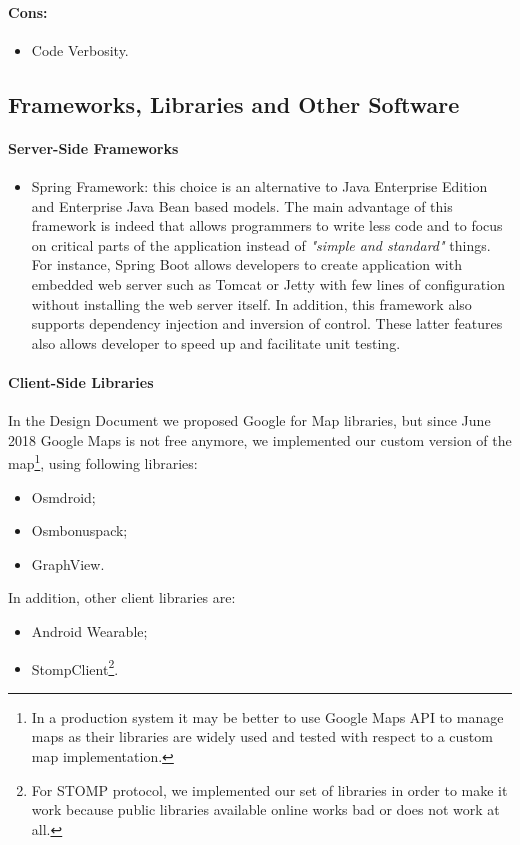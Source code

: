 \documentclass[a4paper]{article}
\begin{document}
\paragraph{Cons:}
\begin{itemize}
    \item Code Verbosity.
\end{itemize}

\subsection{Frameworks, Libraries and Other Software}

\paragraph{Server-Side Frameworks}
\begin{itemize}
    \item Spring Framework: this choice is an alternative to Java Enterprise Edition and Enterprise Java Bean based models. The main advantage of this framework is indeed that allows programmers to write less code and to focus on critical parts of the application instead of \textit{"simple and standard"} things. For instance, Spring Boot allows developers to create application with embedded web server such as Tomcat or Jetty with few lines of configuration without installing the web server itself. In addition, this framework also supports dependency injection and inversion of control. These latter features also allows developer to speed up and facilitate unit testing.
\end{itemize}

\newpage
\paragraph{Client-Side Libraries}
In the Design Document we proposed Google for Map libraries, but since June 2018 Google Maps is not free anymore, we implemented our custom version  of the map\footnote{In a production system it may be better to use Google Maps API to manage maps as their libraries are widely used and tested with respect to a custom map implementation.}, using following libraries:
\begin{itemize}
    \item Osmdroid;
    \item Osmbonuspack;
    \item GraphView.
\end{itemize}
In addition, other client libraries are:
\begin{itemize}    
    \item Android Wearable;
    \item StompClient\footnote{For STOMP protocol, we implemented our set of libraries in order to make it work because public libraries available online works bad or does not work at all.}.
\end{itemize}
\end{document}
